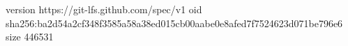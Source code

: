 version https://git-lfs.github.com/spec/v1
oid sha256:ba2d54a2cf348f3585a58a38ed015cb00aabe0e8afed7f7524623d071be796e6
size 446531

